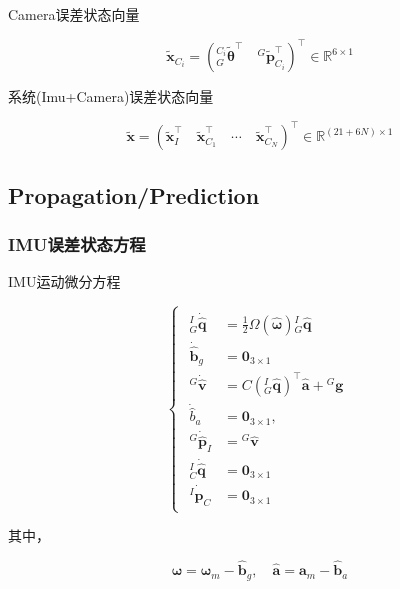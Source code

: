 \documentclass[12pt,a4paper]{article}
\begin{document}
Camera误差状态向量

\begin{equation*}
\tilde{\mathbf{x}}_{C_i} = 
\left(
{}^{C_i}_G\tilde{\boldsymbol{\theta}}^\top \quad
{}^G\tilde{\mathbf{p}}_{C_i}^\top
\right)^\top
\in \mathbb{R}^{6 \times 1}
\end{equation*}

系统(Imu+Camera)误差状态向量

\begin{equation*}
\tilde{\mathbf{x}} = 
\left(
\tilde{\mathbf{x}}_I^\top \quad
\tilde{\mathbf{x}}_{C_1}^\top \quad
\cdots \quad 
\tilde{\mathbf{x}}_{C_N}^\top
\right)^\top
\in \mathbb{R}^{(21+6N) \times 1}
\end{equation*}


\subsection{Propagation/Prediction}

\subsubsection{IMU误差状态方程}

IMU运动微分方程

\begin{equation}
\label{equ:imu_diff_func}
\begin{cases}
\begin{aligned}
{}^I_G\dot{\hat{\mathbf{q}}} &= \frac{1}{2}\Omega(\hat{\boldsymbol{\omega}}) {}^I_G\hat{\mathbf{q}} \\
\dot{\hat{\mathbf{b}}}_g &= \mathbf{0}_{3\times 1} \\
{}^G\dot{\hat{\mathbf{v}}} &= C\left({}^I_G\hat{\mathbf{q}}\right)^\top \hat{\mathbf{a}} + {}^G\mathbf{g} \\
\dot{\hat{b}}_a &= \mathbf{0}_{3\times 1}, \\
{}^G\dot{\hat{\mathbf{p}}}_I &= {}^G\hat{\mathbf{v}} \\
{}^I_C\dot{\hat{\mathbf{q}}} &= \mathbf{0}_{3\times 1} \\
{}^I\dot{\hat{\mathbf{p}}}_C &= \mathbf{0}_{3\times 1}
\end{aligned}
\end{cases}
\end{equation}

其中，

\begin{equation*}
\hat{\boldsymbol{\omega}} = \boldsymbol{\omega}_m - \hat{\mathbf{b}}_g, \quad
\hat{\mathbf{a}} = \mathbf{a}_m - \hat{\mathbf{b}}_a
\end{equation*}
\end{document}
